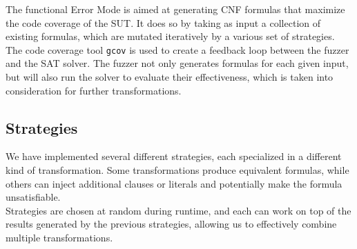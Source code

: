 \documentclass{article}
\begin{document}
The functional Error Mode is aimed at generating CNF formulas that maximize the code coverage of the SUT. 
It does so by taking as input a collection of existing formulas, which are mutated iteratively by a 
various set of strategies.\\

The code coverage tool \verb|gcov| is used to create a feedback loop between the fuzzer and the SAT solver.
The fuzzer not only generates formulas for each given input, but will also run the solver to evaluate
their effectiveness, which is taken into consideration for further transformations.

\subsection{Strategies}

We have implemented several different strategies, each specialized in a different kind of transformation.
Some transformations produce equivalent formulas, while others can inject additional clauses or literals
and potentially make the formula unsatisfiable. \\

Strategies are chosen at random during runtime, and each can work on top of the results generated by the
previous strategies, allowing us to effectively combine multiple transformations. \\
\end{document}
